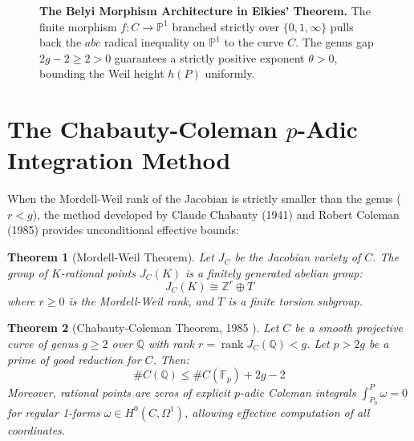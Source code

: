 \documentclass[11pt,a4paper]{article}
\newtheorem{theorem}{Theorem}[section]
\theoremstyle{definition}
\begin{document}
\begin{figure}[htbp]
\centering
{}
\caption{\textbf{The Belyi Morphism Architecture in Elkies' Theorem.} The finite morphism $f: C \to \mathbb{P}^1$ branched strictly over $\{0, 1, \infty\}$ pulls back the $abc$ radical inequality on $\mathbb{P}^1$ to the curve $C$. The genus gap $2g - 2 \ge 2 > 0$ guarantees a strictly positive exponent $\theta > 0$, bounding the Weil height $h(P)$ uniformly.}
\label{fig:belyi_architecture}
\end{figure}

\section{The Chabauty-Coleman $p$-Adic Integration Method}

When the Mordell-Weil rank of the Jacobian is strictly smaller than the genus ($r < g$), the method developed by Claude Chabauty (1941) \cite{chabauty1941} and Robert Coleman (1985) \cite{coleman1985} provides unconditional effective bounds:

\begin{theorem}[Mordell-Weil Theorem]\label{thm:mordell_weil}
Let $J_C$ be the Jacobian variety of $C$. The group of $K$-rational points $J_C(K)$ is a finitely generated abelian group:
\begin{equation}\label{eq:mordell_weil_group}
J_C(K) \cong \mathbb{Z}^r \oplus T
\end{equation}
where $r \ge 0$ is the Mordell-Weil rank, and $T$ is a finite torsion subgroup.
\end{theorem}

\begin{theorem}[Chabauty-Coleman Theorem, 1985 \cite{coleman1985}]\label{thm:chabauty_coleman}
Let $C$ be a smooth projective curve of genus $g \ge 2$ over $\mathbb{Q}$ with rank $r = \operatorname{rank} J_C(\mathbb{Q}) < g$. Let $p > 2g$ be a prime of good reduction for $C$.
Then:
\begin{equation}\label{eq:coleman_bound}
\# C(\mathbb{Q}) \le \# C(\mathbb{F}_p) + 2g - 2
\end{equation}
Moreover, rational points are zeros of explicit $p$-adic Coleman integrals $\int_{P_0}^P \omega = 0$ for regular 1-forms $\omega \in H^0(C, \Omega^1)$, allowing effective computation of all coordinates.
\end{theorem}
\end{document}
